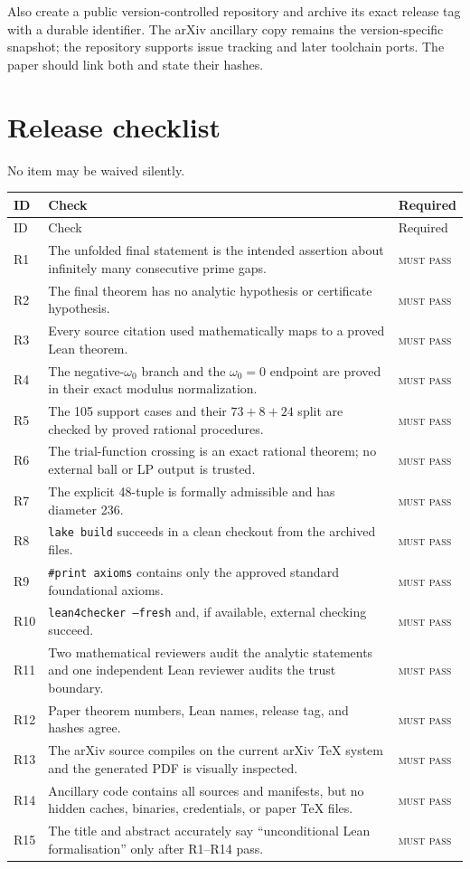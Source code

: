 \documentclass[11pt]{article}
\newcommand{\leanname}[1]{\texttt{#1}}
\newcommand{\mustpass}{\textsc{must pass}}
\begin{document}
Also create a public version-controlled repository and archive its exact
release tag with a durable identifier.  The arXiv ancillary copy remains the
version-specific snapshot; the repository supports issue tracking and later
toolchain ports.  The paper should link both and state their hashes.

\section{Release checklist}

No item may be waived silently.

\begin{longtable}{p{}p{}p{}}
\toprule
ID & Check & Required \\
\midrule
\endfirsthead
\toprule
ID & Check & Required \\
\midrule
\endhead
R1 & The unfolded final statement is the intended assertion about infinitely
many consecutive prime gaps. & \mustpass \\
R2 & The final theorem has no analytic hypothesis or certificate hypothesis. &
\mustpass \\
R3 & Every source citation used mathematically maps to a proved Lean theorem. &
\mustpass \\
R4 & The negative-\(\omega_0\) branch and the \(\omega_0=0\) endpoint are
proved in their exact modulus normalization. & \mustpass \\
R5 & The 105 support cases and their \(73+8+24\) split are checked by proved
rational procedures. & \mustpass \\
R6 & The trial-function crossing is an exact rational theorem; no external
ball or LP output is trusted. & \mustpass \\
R7 & The explicit 48-tuple is formally admissible and has diameter 236. &
\mustpass \\
R8 & \leanname{lake build} succeeds in a clean checkout from the archived
files. & \mustpass \\
R9 & \leanname{\#print axioms} contains only the approved standard foundational
axioms. & \mustpass \\
R10 & \leanname{lean4checker --fresh} and, if available, external checking
succeed. & \mustpass \\
R11 & Two mathematical reviewers audit the analytic statements and one
independent Lean reviewer audits the trust boundary. & \mustpass \\
R12 & Paper theorem numbers, Lean names, release tag, and hashes agree. &
\mustpass \\
R13 & The arXiv source compiles on the current arXiv TeX system and the generated
PDF is visually inspected. & \mustpass \\
R14 & Ancillary code contains all sources and manifests, but no hidden caches,
binaries, credentials, or paper TeX files. & \mustpass \\
R15 & The title and abstract accurately say ``unconditional Lean
formalisation'' only after R1--R14 pass. & \mustpass \\
\bottomrule
\end{longtable}
\end{document}
